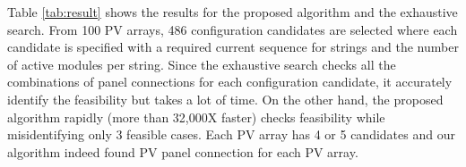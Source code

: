 \documentclass[conference]{IEEEtran}
\begin{document}
Table \ref{tab:result} shows the results for the proposed algorithm and the exhaustive search.
From 100 PV arrays, 486 configuration candidates are selected where each candidate is specified with a required current sequence for strings and the number of active modules per string.
Since the exhaustive search checks all the combinations of panel connections for each configuration candidate, it accurately identify the feasibility but takes a lot of time.
On the other hand, the proposed algorithm rapidly (more than 32,000X faster) checks feasibility while misidentifying only 3 feasible cases. 
Each PV array has 4 or 5 candidates and our algorithm indeed found PV panel connection for each PV array.

\end{document}
